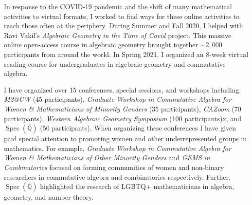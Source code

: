 \documentclass[11pt,reqno]{amsart}
\theoremstyle{remark}
\newcommand{\Spec}{\operatorname{Spec}}
\newcommand{\Q}{\mathbb{Q}}
\begin{document}
In response to the COVID-19 pandemic and the shift of many mathematical activities to virtual formats, I worked to find ways for these online activities to reach those often at the periphery. During Summer and Fall 2020, I helped with Ravi Vakil's \textit{Algebraic Geometry in the Time of Covid} project. This massive online open-access course in algebraic geometry brought together $\sim2,000$ participants from around the world. In Spring 2021, I organized an 8-week virtual reading course for undergraduates in algebraic geometry and commutative algebra. 


I have organized over 15 conferences, special sessions, and workshops including: \textit{M2@UW} (45 participants), \textit{Graduate Workshop in Commutative Algebra for Women \& Mathematicians of Minority Genders} (35 participants), \textit{CAZoom} (70 participants), \textit{Western Algebraic Geometry Symposium} (100 participants)x, and $\Spec(\overline{\Q})$ (50 participants). When organizing these conferences I have given paid special attention to promoting women and other underrepresented groups in mathematics. For example, \textit{Graduate Workshop in Commutative Algebra for Women \& Mathematicians of Other Minority Genders} and \textit{GEMS in Combinatorics}  focused on forming communities of women and non-binary researchers in commutative algebra and combinatorics respectively. Further, $\Spec(\overline{\Q})$ highlighted the research of LGBTQ+ mathematicians in algebra, geometry, and number theory.









\end{document}
